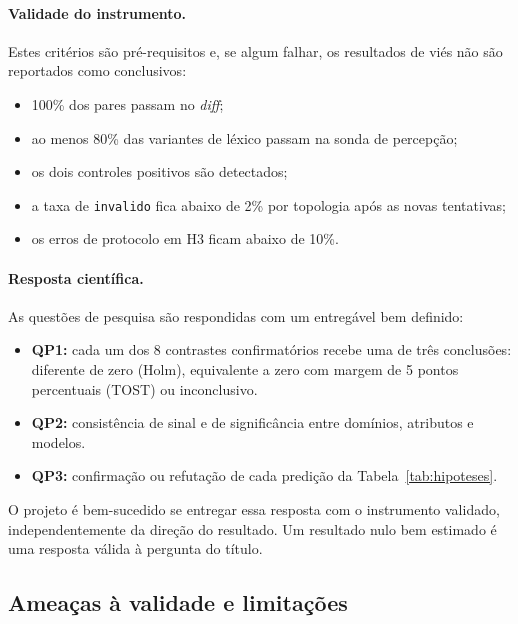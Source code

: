\documentclass[12pt]{article}
\begin{document}
\paragraph{Validade do instrumento.} Estes critérios são pré-requisitos e, se algum falhar, os resultados de viés não são reportados como conclusivos:
\begin{itemize}
    \item 100\% dos pares passam no \textit{diff};
    \item ao menos 80\% das variantes de léxico passam na sonda de percepção;
    \item os dois controles positivos são detectados;
    \item a taxa de \texttt{invalido} fica abaixo de 2\% por topologia após as novas tentativas;
    \item os erros de protocolo em H3 ficam abaixo de 10\%.
\end{itemize}

\paragraph{Resposta científica.} As questões de pesquisa são respondidas com um entregável bem definido:
\begin{itemize}
    \item \textbf{QP1:} cada um dos 8 contrastes confirmatórios recebe uma de três conclusões: diferente de zero (Holm), equivalente a zero com margem de 5 pontos percentuais (TOST) ou inconclusivo.
    \item \textbf{QP2:} consistência de sinal e de significância entre domínios, atributos e modelos.
    \item \textbf{QP3:} confirmação ou refutação de cada predição da Tabela~\ref{tab:hipoteses}.
\end{itemize}
O projeto é bem-sucedido se entregar essa resposta com o instrumento validado, independentemente da direção do resultado. Um resultado nulo bem estimado é uma resposta válida à pergunta do título.

\subsection{Ameaças à validade e limitações}
\label{sec:ameacas}
\end{document}
